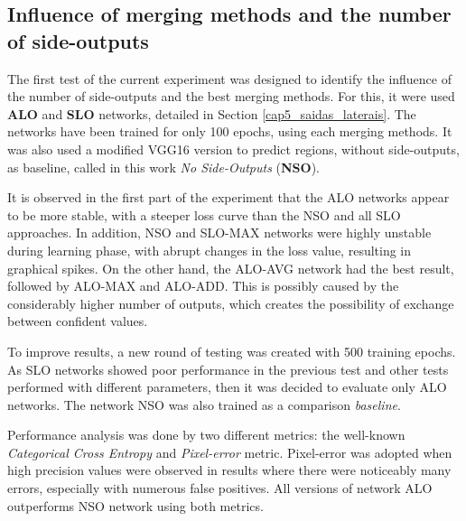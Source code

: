 \subsection{Influence of merging methods and the number of side-outputs}
\label{cap6_experm_1_qtd_saidas}

The first test of the current experiment was designed to identify the influence of the number of side-outputs and the best merging methods.
For this, it were used \textbf{ALO} and \textbf{SLO} networks, detailed in Section \ref{cap5_saidas_laterais}.
The networks have been trained for only 100 epochs, using each merging methods.
It was also used a modified VGG16 version to predict regions, without side-outputs, as baseline, called in this work \textit{No Side-Outputs} (\textbf{NSO}).


It is observed in the first part of the experiment that the ALO networks appear to be more stable, with a steeper loss curve than the NSO and all SLO approaches.
In addition, NSO and SLO-MAX networks were highly unstable during learning phase, with abrupt changes in the loss value, resulting in graphical spikes.
On the other hand, the ALO-AVG network had the best result, followed by ALO-MAX and ALO-ADD.
This is possibly caused by the considerably higher number of outputs, which creates the possibility of exchange between confident values.

To improve results, a new round of testing was created with 500 training epochs.
As SLO networks showed poor performance in the previous test and other tests performed with different parameters, then it was decided to evaluate only ALO networks.
The network NSO was also trained as a comparison \textit{baseline}.

Performance analysis was done by two different metrics: the well-known \textit{Categorical Cross Entropy} and \textit{Pixel-error} metric.
Pixel-error was adopted when high precision values were observed in results where there were noticeably many errors, especially with numerous false positives.
All versions of network ALO outperforms NSO network using both metrics.

